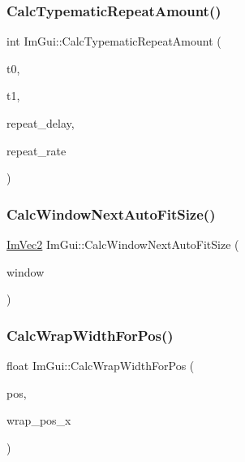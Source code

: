 \subsubsection{\texorpdfstring{Calc\+Typematic\+Repeat\+Amount()}{CalcTypematicRepeatAmount()}}
{\footnotesize\ttfamily int Im\+Gui\+::\+Calc\+Typematic\+Repeat\+Amount (\begin{DoxyParamCaption}\item[{float}]{t0,  }\item[{float}]{t1,  }\item[{float}]{repeat\+\_\+delay,  }\item[{float}]{repeat\+\_\+rate }\end{DoxyParamCaption})}

\mbox{\label{namespaceImGui_aa306c009063e86091ed61d80d4d231f6}} 
\subsubsection{\texorpdfstring{Calc\+Window\+Next\+Auto\+Fit\+Size()}{CalcWindowNextAutoFitSize()}}
{\footnotesize\ttfamily \hyperlink{structImVec2}{Im\+Vec2} Im\+Gui\+::\+Calc\+Window\+Next\+Auto\+Fit\+Size (\begin{DoxyParamCaption}\item[{\hyperlink{structImGuiWindow}{Im\+Gui\+Window} $\ast$}]{window }\end{DoxyParamCaption})}

\mbox{\label{namespaceImGui_a66416151e58c34cd02973976de66e0e9}} 
\subsubsection{\texorpdfstring{Calc\+Wrap\+Width\+For\+Pos()}{CalcWrapWidthForPos()}}
{\footnotesize\ttfamily float Im\+Gui\+::\+Calc\+Wrap\+Width\+For\+Pos (\begin{DoxyParamCaption}\item[{const \hyperlink{structImVec2}{Im\+Vec2} \&}]{pos,  }\item[{float}]{wrap\+\_\+pos\+\_\+x }\end{DoxyParamCaption})}

